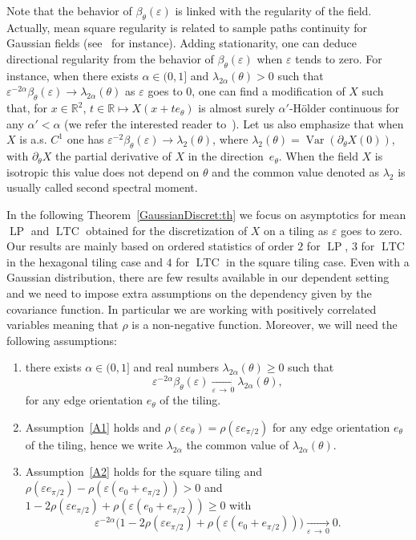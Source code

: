 \documentclass[10pt]{amsart}
\theoremstyle{definition}\newtheorem{defi}[theo]{Definition}\newtheorem{rema}[theo]{Remark}\newtheorem{exam}[theo]{Example}\newtheorem{exem}[theo]{Example}\newtheorem{nota}[theo]{Notation}
\newcommand{\R}{\mathbb{R}}
\newcommand{\eps}{\varepsilon}
\DeclareMathOperator{\LTC}{LTC}
\DeclareMathOperator{\LP}{LP}
\DeclareMathOperator{\Var}{Var}
\newcommand*{\Aenumi}{\renewcommand*{\theenumi}{\bf{A}\arabic{enumi}}}
\begin{document}
Note that the behavior of $\beta_\theta(\eps)$ is linked with the regularity of the field. Actually, mean square regularity is related to sample paths continuity for Gaussian fields (see~\cite{AdlerTaylorBook} for instance). Adding stationarity, one can deduce directional regularity from the behavior of $\beta_\theta(\eps)$ when $\eps$ tends to zero. For instance, when there exists $\alpha \in (0,1]$ and $\lambda_{2\alpha}(\theta)>0$ such that $\eps^{-2\alpha}\beta_\theta(\eps) \rightarrow
\lambda_{2\alpha}(\theta)$ as $\eps$ goes to $0$, one can find a modification of $X$ such that, for $x\in\R^2$, $t\in \R \mapsto X(x+t e_\theta)$ is almost surely $\alpha'$-H\"older continuous for any $\alpha'<\alpha$ (we refer the interested reader to~\cite[Part~2]{BGeosto}). Let us also emphasize that when $X$ is a.s. $C^1$ one has $\eps^{-2}\beta_\theta(\eps) \rightarrow \lambda_{2}(\theta)$, where $\lambda_{2}(\theta)=\Var(\partial_\theta X(0))$, with $\partial_\theta X $ the partial derivative of $X$ in the direction~$e_\theta$. When the field $X$ is isotropic this value does not depend on $\theta$ and the common value denoted as $\lambda_2$ is usually called second spectral moment.



In the following Theorem~\ref{GaussianDiscret:th} we focus on asymptotics for mean $\LP$ and $\LTC$ obtained for the discretization of $X$ on a tiling as $\eps$ goes to zero. Our results are mainly based on ordered statistics of order $2$ for $\LP$, $3$ for $\LTC$ in the hexagonal tiling case and $4$ for $\LTC$ in the square tiling case. Even with a Gaussian distribution, there are few results available in our dependent setting and we need to impose extra assumptions on the dependency given by the covariance function. In particular we are working with positively correlated variables meaning that $\rho$ is a non-negative function. Moreover, we will need the following assumptions:
\begin{enumerate}\Aenumi
\item \label{A1} there exists $\alpha\in (0,1]$ and real numbers $\lambda_{{2\alpha}}(\theta)\geq 0$ such that
\[
\eps^{-2\alpha}\beta_\theta(\eps)\underset{\eps\,\rightarrow\,0}{\longrightarrow} {\lambda_{{2\alpha}}(\theta)},
\]
for any edge orientation $e_\theta$ of the tiling.
\item \label{A2}Assumption~\eqref{A1} holds and $\rho(\eps e_\theta)=\rho(\eps e_{\pi/2})$ for any edge orientation $e_\theta$ of the tiling, hence we write $\lambda_{{2\alpha}}$ the common value of $\lambda_{{2\alpha}}(\theta)$.
\item \label{A3}Assumption~\eqref{A2} holds for the square tiling and $\rho(\eps e_{\pi/2})-\rho(\eps (e_0+e_{\pi/2}))> 0$ and $1-2\rho(\eps e_{\pi/2})+\rho(\eps (e_0+e_{\pi/2}))\ge 0$ with
\[
\eps^{-2\alpha}\big(1-2\rho(\eps e_{\pi/2})+\rho(\eps
(e_0+e_{\pi/2}))\big) \underset{\eps\,\rightarrow\,0}{\longrightarrow} 0.
\]
\end{enumerate}
\end{document}
